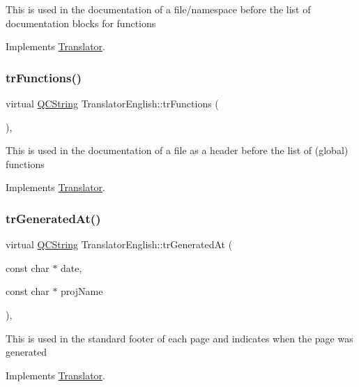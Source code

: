 This is used in the documentation of a file/namespace before the list of documentation blocks for functions 

Implements \mbox{\hyperlink{class_translator}{Translator}}.

\mbox{\label{class_translator_english_a3a213524f10c6829c13ae2223a71b792}} 
\subsubsection{\texorpdfstring{trFunctions()}{trFunctions()}}
{\footnotesize\ttfamily virtual \mbox{\hyperlink{class_q_c_string}{Q\+C\+String}} Translator\+English\+::tr\+Functions (\begin{DoxyParamCaption}{ }\end{DoxyParamCaption})\hspace{0.3cm}{\ttfamily [inline]}, {\ttfamily [virtual]}}

This is used in the documentation of a file as a header before the list of (global) functions 

Implements \mbox{\hyperlink{class_translator}{Translator}}.

\mbox{\label{class_translator_english_a8bfe486d563722fa270563808d35c49a}} 
\subsubsection{\texorpdfstring{trGeneratedAt()}{trGeneratedAt()}}
{\footnotesize\ttfamily virtual \mbox{\hyperlink{class_q_c_string}{Q\+C\+String}} Translator\+English\+::tr\+Generated\+At (\begin{DoxyParamCaption}\item[{const char $\ast$}]{date,  }\item[{const char $\ast$}]{proj\+Name }\end{DoxyParamCaption})\hspace{0.3cm}{\ttfamily [inline]}, {\ttfamily [virtual]}}

This is used in the standard footer of each page and indicates when the page was generated 

Implements \mbox{\hyperlink{class_translator}{Translator}}.

